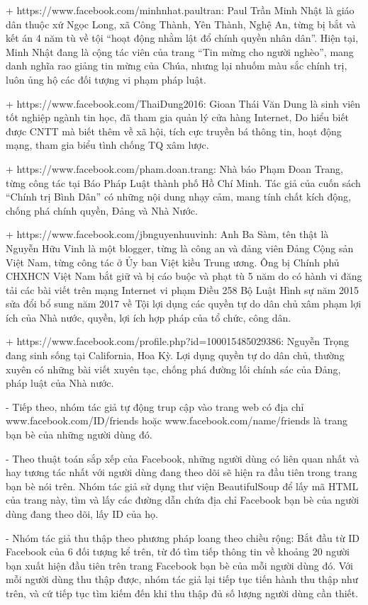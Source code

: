 		+	https://www.facebook.com/minhnhat.paultran: Paul Trần Minh Nhật là giáo dân thuộc xứ Ngọc Long, xã Công Thành, Yên Thành, Nghệ An, từng bị bắt và kết án 4 năm tù về tội “hoạt động nhằm lật đổ chính quyền nhân dân”. Hiện tại, Minh Nhật đang là cộng tác viên của trang “Tin mừng cho người nghèo”, mang danh nghĩa rao giảng tin mừng của Chúa, nhưng lại nhuốm màu sắc chính trị, luôn ủng hộ các đối tượng vi phạm pháp luật.
		
		+	https://www.facebook.com/ThaiDung2016: Gioan Thái Văn Dung là sinh viên tốt nghiệp ngành tin học, đã tham gia quản lý cửa hàng Internet, Do hiểu biết được CNTT mà biết thêm về xã hội, tích cực truyền bá thông tin, hoạt động mạng, tham gia biểu tình chống TQ xâm lược.
		
		+	https://www.facebook.com/pham.doan.trang: Nhà báo Phạm Đoan Trang, từng công tác tại Báo Pháp Luật thành phố Hồ Chí Minh. Tác giả của cuốn sách “Chính trị Bình Dân” có những nội dung nhạy cảm, mang tính chất kích động, chống phá chính quyền, Đảng và Nhà Nước.
		
		+	https://www.facebook.com/jbnguyenhuuvinh: Anh Ba Sàm, tên thật là Nguyễn Hữu Vinh là một blogger, từng là công an và đảng viên Đảng Cộng sản Việt Nam, từng công tác ở Ủy ban Việt kiều Trung ương. Ông bị Chính phủ CHXHCN Việt Nam bắt giữ và bị cáo buộc và phạt tù 5 năm do có hành vi đăng tải các bài viết trên mạng Internet vi phạm Điều 258 Bộ Luật Hình sự năm 2015 sửa đổi bổ sung năm 2017 về Tội lợi dụng các quyền tự do dân chủ xâm phạm lợi ích của Nhà nước, quyền, lợi ích hợp pháp của tổ chức, công dân.
		
		+	https://www.facebook.com/profile.php?id=100015485029386: Nguyễn Trọng đang sinh sống tại California, Hoa Kỳ. Lợi dụng quyền tự do dân chủ, thường xuyên có những bài viết xuyên tạc, chống phá đường lối chính sác của Đảng, pháp luật của Nhà nước.
		
		- Tiếp theo, nhóm tác giả tự động trup cập vào trang web có địa chỉ www.facebook.com/{ID}/friends hoặc www.facebook.com/{name}/friends là trang bạn bè của những người dùng đó.
		
		- Theo thuật toán sắp xếp của Facebook, những người dùng có liên quan nhất và hay tương tác nhất với người dùng đang theo dõi sẽ hiện ra đầu tiên trong trang bạn bè nói trên. Nhóm tác giả sử dụng thư viện BeautifulSoup để lấy mã HTML của trang này, tìm và lấy các đường dẫn chứa địa chỉ Facebook bạn bè của người dùng đang theo dõi, lấy ID của họ.
		
		- Nhóm tác giả thu thập theo phương pháp loang theo chiều rộng: Bắt đầu từ ID Facebook của 6 đối tượng kể trên, từ đó tìm tiếp thông tin về khoảng 20 người bạn xuất hiện đầu tiên trên trang Facebook bạn bè của mỗi người dùng đó. Với mỗi người dùng thu thập được, nhóm tác giả lại tiếp tục tiến hành thu thập như trên, và cứ tiếp tục tìm kiếm đến khi thu thập đủ số lượng người dùng cần thiết.
		
